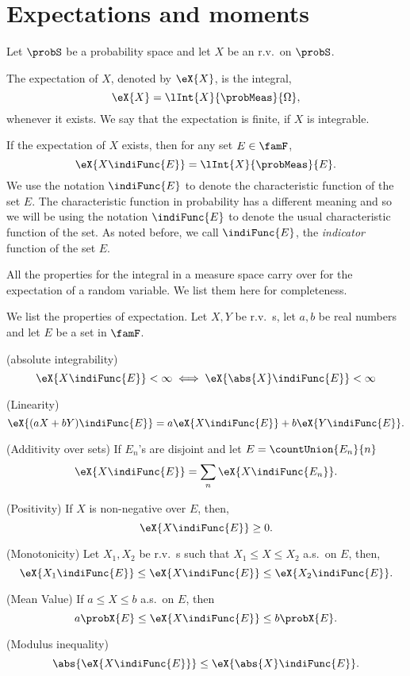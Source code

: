\section{Expectations and moments}
Let $\probS$ be a probability space and let $X$ be an r.v.~on $\probS$.
\begin{Definition}[name=Expectation]
    The expectation of $X$, denoted by $\eX{X}$, is the integral,
    \[\eX{X} = \lInt{X}{\probMeas}{\Omega},\]
    whenever it exists. We say that the expectation is finite, if $X$ is integrable.
\end{Definition}
\begin{Remark}
    If the expectation of $X$ exists, then for any set $E \in \famF$,
    \[\eX{X\indiFunc{E}} = \lInt{X}{\probMeas}{E}.\]
    We use the notation $\indiFunc{E}$ to denote the characteristic function of the set $E$. The
    characteristic function in probability has a different meaning and so we will be using the notation
    $\indiFunc{E}$ to denote the usual characteristic function of the set. As noted before, we call
    $\indiFunc{E}$, the \emph{indicator} function of the set $E$.
\end{Remark}
All the properties for the integral in a measure space carry over for the expectation of a random variable. We
list them here for completeness.
\begin{Observation}
    We list the properties of expectation. Let $X,Y$ be r.v.~s, let $a,b$ be real numbers and let $E$ be a set
    in $\famF$.
    \begin{properties}[series=expect]
    \item
	(absolute integrability) \[\eX{X\indiFunc{E}} < \infty \iff \eX{\abs{X}\indiFunc{E}} < \infty\]
    \item
	(Linearity) \[\eX{(aX + bY)\indiFunc{E}} = a\eX{X\indiFunc{E}} + b \eX{Y\indiFunc{E}}.\]
    \item
	(Additivity over sets) If $E_n$'s are disjoint and let $E = \countUnion{E_n}{n}$
	\[\eX{X\indiFunc{E}} = \sum\limits_{n}\eX{X\indiFunc{E_n}}.\]
    \item
	(Positivity) If $X$ is non-negative over $E$, then,
	\[\eX{X\indiFunc{E}} \ge 0.\]
    \item
	(Monotonicity) Let $X_1,X_2$ be r.v.~s such that $X_1 \leq X \leq X_2$ a.s.~on $E$, then,
	\[\eX{X_1\indiFunc{E}} \leq \eX{X\indiFunc{E}} \leq \eX{X_2\indiFunc{E}}.\]
    \item
	(Mean Value) If $a \leq X \leq b$ a.s.~on $E$, then
	\[a\probX{E} \leq \eX{X\indiFunc{E}} \leq b\probX{E}.\]
    \item
	(Modulus inequality)
	\[\abs{\eX{X\indiFunc{E}}} \leq \eX{\abs{X}\indiFunc{E}}.\]
    \end{properties}
\end{Observation}
